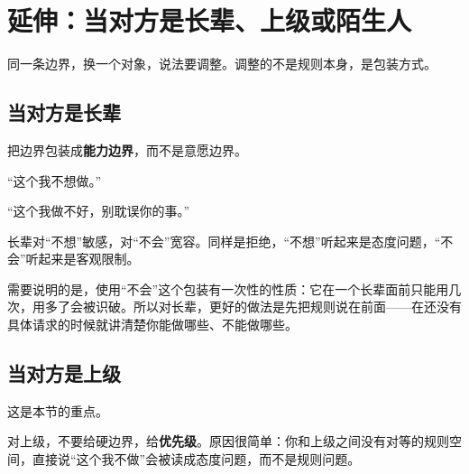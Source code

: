 



\section{延伸：当对方是长辈、上级或陌生人}

同一条边界，换一个对象，说法要调整。调整的不是规则本身，是包装方式。

\subsection{当对方是长辈}

把边界包装成\textbf{能力边界}，而不是意愿边界。

\begin{mdquote}
“这个我不想做。”\par
{}“这个我做不好，别耽误你的事。”
\end{mdquote}

长辈对“不想”敏感，对“不会”宽容。同样是拒绝，“不想”听起来是态度问题，“不会”听起来是客观限制。

需要说明的是，使用“不会”这个包装有一次性的性质：它在一个长辈面前只能用几次，用多了会被识破。所以对长辈，更好的做法是先把规则说在前面——在还没有具体请求的时候就讲清楚你能做哪些、不能做哪些。

\subsection{当对方是上级}

这是本节的重点。

对上级，不要给硬边界，给\textbf{优先级}。原因很简单：你和上级之间没有对等的规则空间，直接说“这个我不做”会被读成态度问题，而不是规则问题。

